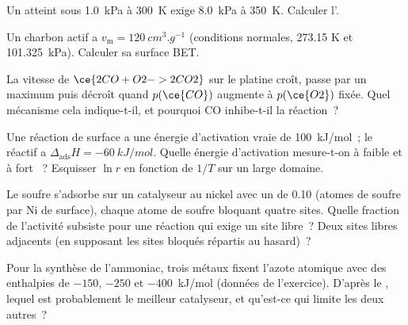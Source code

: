 \begin{exercise}[$\star\star$]\label{exo:b3:surfaces-catalysis:7}
Un  atteint sous \qty{1.0}{kPa} à \qty{300}{K} exige
\qty{8.0}{kPa} à \qty{350}{K}. Calculer l'.
\end{exercise}

\begin{exercise}[$\star\star$]\label{exo:b3:surfaces-catalysis:8}
Un charbon actif a $v_{\mathrm m} = \qty{120}{cm^3.g^{-1}}$ (conditions
normales, 273.15 K et
\qty{101.325}{kPa}). Calculer sa surface BET.
\end{exercise}

\begin{exercise}[$\star\star$]\label{exo:b3:surfaces-catalysis:9}
La vitesse de $\ce{2 CO + O2 -> 2 CO2}$ sur le platine croît, passe par un
maximum puis décroît quand $p(\ce{CO})$
augmente à $p(\ce{O2})$ fixée. Quel mécanisme cela indique-t-il, et
pourquoi CO inhibe-t-il la réaction~?
\end{exercise}

\begin{exercise}[$\star\star\star$]\label{exo:b3:surfaces-catalysis:10}
Une réaction de surface a une énergie d'activation vraie de
\qty{100}{kJ/mol}~; le réactif a
$\Delta_{\mathrm{ads}}H = \qty{-60}{kJ/mol}$. Quelle énergie
d'activation mesure-t-on à faible et à fort ~?
Esquisser $\ln r$ en fonction de $1/T$ sur un large domaine.
\end{exercise}

\begin{exercise}[$\star\star\star$]\label{exo:b3:surfaces-catalysis:11}
Le soufre s'adsorbe sur un catalyseur au nickel avec un  de 0.10 (atomes de soufre par Ni de surface), chaque atome
de soufre bloquant quatre sites. Quelle fraction de l'activité subsiste
pour une réaction qui exige un site libre~? Deux sites libres adjacents
(en supposant les sites bloqués répartis au hasard)~?
\end{exercise}

\begin{exercise}[$\star\star\star$]\label{exo:b3:surfaces-catalysis:12}
Pour la synthèse de l'ammoniac, trois métaux fixent l'azote atomique avec
des enthalpies de
$-150$, $-250$ et \qty{-400}{kJ/mol} (données de l'exercice). D'après le
, lequel est probablement le meilleur catalyseur, et
qu'est-ce qui limite les deux autres~?
\end{exercise}


